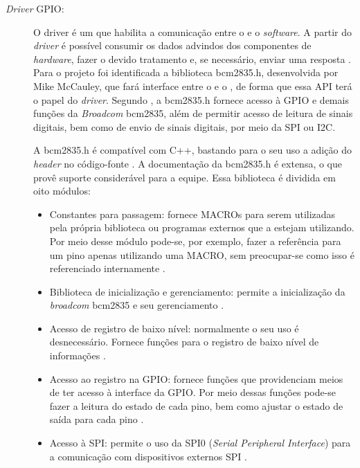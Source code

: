 \begin{description}
\item[\textit{Driver} GPIO:] O driver é um \software que habilita a comunicação
entre o \hardware e o \textit{software}. A partir do \textit{driver} é possível consumir os
dados advindos dos componentes de \textit{hardware}, fazer o devido tratamento e, se
necessário, enviar uma resposta \cite{windows2016}. Para o projeto foi
identificada a biblioteca \textsf{bcm2835.h}, desenvolvida por Mike McCauley,
que fará interface entre o \hardware e o \middleware, de forma que essa API
terá o papel do \textit{driver}. Segundo , a
\textsf{bcm2835.h} fornece acesso à GPIO e demais funções da \textit{Broadcom}
bcm2835, além de permitir acesso de leitura de sinais digitais, bem como de
envio de sinais digitais, por meio da SPI ou I2C.
\par
A \textsf{bcm2835.h} é compatível com C++, bastando para o seu uso a adição do
\textit{header} no código-fonte \cite{mccauley2015}. A documentação da
\textsf{bcm2835.h} é extensa, o que provê suporte considerável para a equipe.
Essa biblioteca é dividida em oito módulos:
\begin{itemize}
  \item Constantes para passagem: fornece \textsf{MACROs} para serem utilizadas
  pela própria biblioteca ou programas externos que a estejam utilizando. Por
  meio desse módulo pode-se, por exemplo, fazer a referência para um pino apenas
  utilizando uma \textsf{MACRO}, sem preocupar-se como isso é referenciado
  internamente \cite{mccauley2015}.
  
  \item Biblioteca de inicialização e gerenciamento: permite a inicialização da
  \textit{broadcom} bcm2835 e seu gerenciamento \cite{mccauley2015}.
  
  \item Acesso de registro de baixo nível: normalmente o seu uso é desnecessário.
  Fornece funções para o registro de baixo nível de informações \cite{mccauley2015}.
  
  \item  Acesso ao registro na GPIO: fornece funções que providenciam meios de ter
  acesso à interface da GPIO. Por meio dessas funções pode-se fazer a leitura do
  estado de cada pino, bem como ajustar o estado de saída para cada pino
  \cite{mccauley2015}.
  
  \item Acesso à SPI: permite o uso da SPI0 (\textit{Serial Peripheral Interface})
  para a comunicação com dispositivos externos SPI \cite{mccauley2015}.
  

\end{itemize}
\end{description}
